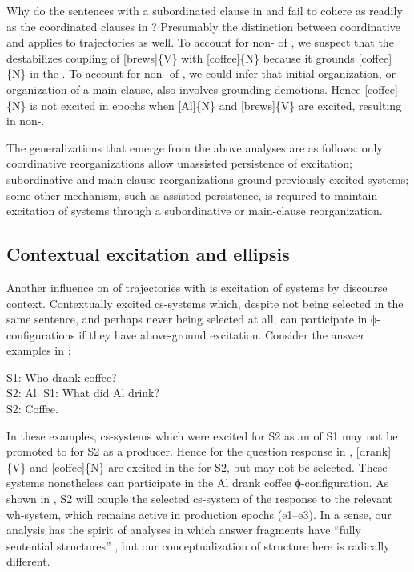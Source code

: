   Why do the sentences with a subordinated clause in  and  fail to cohere as readily as the coordinated clauses in ? Presumably the distinction between coordinative and  applies to  trajectories as well. To account for non- of , we suspect that the  destabilizes coupling of [brews]\{V\} with [coffee]\{N\} because it grounds [coffee]\{N\} in the . To account for non- of , we could infer that initial organization, or organization of a main clause, also involves grounding demotions. Hence [coffee]\{N\} is not excited in epochs when [Al]\{N\} and [brews]\{V\} are excited, resulting in non-. 

  The generalizations that emerge from the above analyses are as follows: only coordinative reorganizations allow unassisted persistence of excitation; subordinative and main-clause reorganizations ground previously excited systems; some other mechanism, such as assisted persistence, is required to maintain excitation of systems through a subordinative or main-clause reorganization. 

\subsection{Contextual excitation and ellipsis}

Another influence on  of trajectories with  is excitation of systems by discourse context. Contextually excited cs-systems which, despite not being selected in the same sentence, and perhaps never being selected at all, can participate in ϕ-con\-fig\-u\-ra\-tions if they have above-ground excitation. Consider the answer  examples in :

\ea\label{ex:7:8}
    \ea S1: {Who drank coffee?}\\  S2: {Al}.\label{ex:7:8a}
    \ex S1: {What did Al drink?}\\  S2: {Coffee.}\label{ex:7:8b}
\z
\z

  In these examples, cs-systems which were excited for S2 as an  of S1 may not be promoted to  for S2 as a producer. Hence for the question response in , [drank]\{V\} and [coffee]\{N\} are excited in the  for S2, but may not be selected. These systems nonetheless can participate in the {\textbar}Al drank coffee{\textbar} ϕ-con\-fig\-u\-ra\-tion. As shown in {}, S2 will couple the selected cs-system of the response to the relevant wh-system, which remains active in production epochs (e1--e3). In a sense, our analysis has the spirit of analyses in which answer fragments have “fully sentential structures”  \citep{Merchant2005}, but our conceptualization of structure here is radically different.

